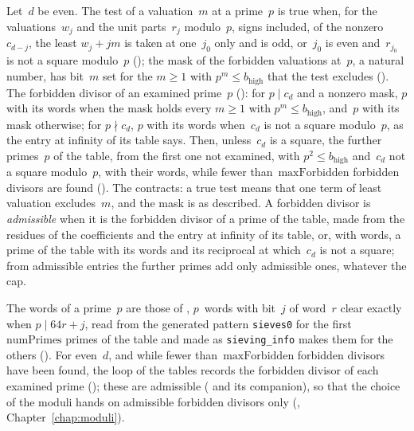\begin{definition}\label{def:forbidden}
  \leanok
  Let~$d$ be even. The test of a valuation~$m$ at a prime~$p$ is true when, for the valuations~$w_j$
  and the unit parts~$r_j$ modulo~$p$, signs included, of the nonzero~$c_{d-j}$, the least
  $w_j + j m$ is taken at one~$j_0$ only and is odd, or~$j_0$ is even and~$r_{j_0}$ is not a square
  modulo~$p$ (); the mask of the forbidden valuations at~$p$, a
  natural number, has bit~$m$ set for the $m \ge 1$ with $p^m \le b_{\mathrm{high}}$ that the test
  excludes (). The forbidden divisor of an examined prime~$p$
  (): for $p \mid c_d$ and a nonzero mask, $p$ with its words
  when the mask holds every $m \ge 1$ with $p^m \le b_{\mathrm{high}}$, and~$p$ with its mask
  otherwise; for $p \nmid c_d$, $p$ with its words when~$c_d$ is not a square modulo~$p$, as the
  entry at infinity of its table says. Then, unless~$c_d$ is a square, the further primes~$p$ of the
  table, from the first one not examined, with $p^2 \le b_{\mathrm{high}}$ and~$c_d$ not a square
  modulo~$p$, with their words, while fewer than~$\mathrm{maxForbidden}$ forbidden divisors are
  found (). The contracts: a true test means that one term of
  least valuation excludes~$m$, and the mask is as described. A forbidden divisor is
  \emph{admissible} when it is the forbidden divisor of a prime of the table, made from the residues
  of the coefficients and the entry at infinity of its table, or, with words, a prime of the table
  with its words and its reciprocal at which~$c_d$ is not a square; from admissible entries the
  further primes add only admissible ones, whatever the cap.
\end{definition}

The words of a prime~$p$ are those of , $p$~words with bit~$j$
of word~$r$ clear exactly when $p \mid 64 r + j$, read from the generated pattern \verb|sieves0| for
the first~$\mathrm{numPrimes}$ primes of the table and made as \verb|sieving_info| makes them for
the others (). For even~$d$, and while fewer
than~$\mathrm{maxForbidden}$ forbidden divisors have been found, the loop of the tables records the
forbidden divisor of each examined prime (); these are admissible
( and its companion), so
that the choice of the moduli hands on admissible forbidden divisors only
(, Chapter~\ref{chap:moduli}).

